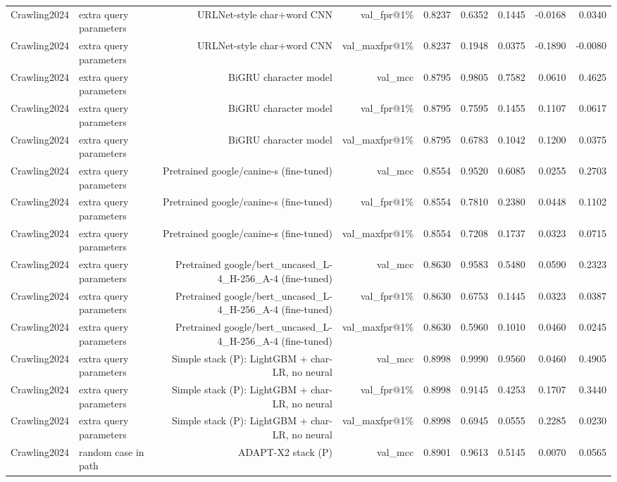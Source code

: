 \begin{table}[t]
\begin{tabular}{llrrrrrrr}
Crawling2024 & extra query parameters & URLNet-style char+word CNN & val\_fpr@1\% & 0.8237 & 0.6352 & 0.1445 & -0.0168 & 0.0340 \\
Crawling2024 & extra query parameters & URLNet-style char+word CNN & val\_maxfpr@1\% & 0.8237 & 0.1948 & 0.0375 & -0.1890 & -0.0080 \\
Crawling2024 & extra query parameters & BiGRU character model & val\_mcc & 0.8795 & 0.9805 & 0.7582 & 0.0610 & 0.4625 \\
Crawling2024 & extra query parameters & BiGRU character model & val\_fpr@1\% & 0.8795 & 0.7595 & 0.1455 & 0.1107 & 0.0617 \\
Crawling2024 & extra query parameters & BiGRU character model & val\_maxfpr@1\% & 0.8795 & 0.6783 & 0.1042 & 0.1200 & 0.0375 \\
Crawling2024 & extra query parameters & Pretrained google/canine-s (fine-tuned) & val\_mcc & 0.8554 & 0.9520 & 0.6085 & 0.0255 & 0.2703 \\
Crawling2024 & extra query parameters & Pretrained google/canine-s (fine-tuned) & val\_fpr@1\% & 0.8554 & 0.7810 & 0.2380 & 0.0448 & 0.1102 \\
Crawling2024 & extra query parameters & Pretrained google/canine-s (fine-tuned) & val\_maxfpr@1\% & 0.8554 & 0.7208 & 0.1737 & 0.0323 & 0.0715 \\
Crawling2024 & extra query parameters & Pretrained google/bert\_uncased\_L-4\_H-256\_A-4 (fine-tuned) & val\_mcc & 0.8630 & 0.9583 & 0.5480 & 0.0590 & 0.2323 \\
Crawling2024 & extra query parameters & Pretrained google/bert\_uncased\_L-4\_H-256\_A-4 (fine-tuned) & val\_fpr@1\% & 0.8630 & 0.6753 & 0.1445 & 0.0323 & 0.0387 \\
Crawling2024 & extra query parameters & Pretrained google/bert\_uncased\_L-4\_H-256\_A-4 (fine-tuned) & val\_maxfpr@1\% & 0.8630 & 0.5960 & 0.1010 & 0.0460 & 0.0245 \\
Crawling2024 & extra query parameters & Simple stack (P): LightGBM + char-LR, no neural & val\_mcc & 0.8998 & 0.9990 & 0.9560 & 0.0460 & 0.4905 \\
Crawling2024 & extra query parameters & Simple stack (P): LightGBM + char-LR, no neural & val\_fpr@1\% & 0.8998 & 0.9145 & 0.4253 & 0.1707 & 0.3440 \\
Crawling2024 & extra query parameters & Simple stack (P): LightGBM + char-LR, no neural & val\_maxfpr@1\% & 0.8998 & 0.6945 & 0.0555 & 0.2285 & 0.0230 \\
Crawling2024 & random case in path & ADAPT-X2 stack (P) & val\_mcc & 0.8901 & 0.9613 & 0.5145 & 0.0070 & 0.0565 \\

\end{tabular}
\end{table}
